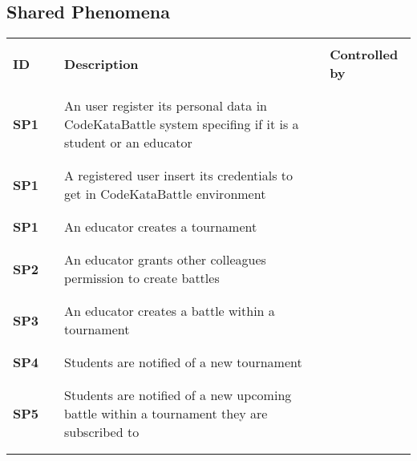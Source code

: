 \subsection{Shared Phenomena}

\renewcommand{\arraystretch}{0.5} 
\begin{longtable}[H]{l l p{8.5cm} l l}
    \hline 
                      & & & & \\
        \textbf{ID}   & \vline & \textbf{Description} & \vline & \textbf{Controlled by} \\   
                      & & & & \\\hline & & & & \\
        \textbf{SP1}  & \vline & An user register its personal data in CodeKataBattle system specifing if it is a student or an educator & \vline & \\              
                      & & & & \\\hline & & & & \\
        \textbf{SP1}  & \vline & A registered user insert its credentials to get in CodeKataBattle environment & \vline & \\                         
                      & & & & \\\hline & & & & \\
        \textbf{SP1}  & \vline & An educator creates a tournament & \vline & \\
                      & & & & \\\hline & & & & \\
        \textbf{SP2}  & \vline & An educator grants other colleagues permission to create battles & \vline & \\
                      & & & & \\\hline & & & & \\
        \textbf{SP3}  & \vline & An educator creates a battle within a tournament & \vline & \\
                      & & & & \\\hline & & & & \\
        \textbf{SP4}  & \vline & Students are notified of a new tournament & \vline & \\
                      & & & & \\\hline & & & & \\
        \textbf{SP5}  & \vline & Students are notified of a new upcoming battle within a tournament they are subscribed to & \vline & \\
                      & & & & \\\hline & & & & \\

\end{longtable}
